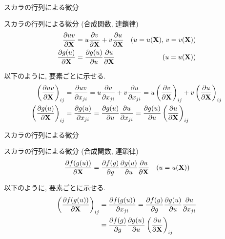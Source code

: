 \documentclass[dvipdfmx,notheorems,t]{beamer}
\begin{document}
\begin{frame}{スカラの行列による微分}
\begin{block}{スカラの行列による微分 (合成関数, 連鎖律)}
  \begin{align*}
    \pdv{uv}{\vb{X}} &= u \pdv{v}{\vb{X}} + v \pdv{u}{\vb{X}}
      & \text{($u = u(\vb{X})$, $v = v(\vb{X})$)} \\
    \pdv{g(u)}{\vb{X}} &= \pdv{g(u)}{u} \pdv{u}{\vb{X}}
      & \text{($u = u(\vb{X})$)}
  \end{align*}
\end{block}

以下のように, 要素ごとに示せる.
\begin{align*}
  \left( \pdv{uv}{\vb{X}} \right)_{ij} &= \pdv{uv}{x_{ji}}
    = u \pdv{v}{x_{ji}} + v \pdv{u}{x_{ji}}
    = u \left( \pdv{v}{\vb{X}} \right)_{ij} + v \left( \pdv{u}{\vb{X}} \right)_{ij} \\
  \left( \pdv{g(u)}{\vb{X}} \right)_{ij} &= \pdv{g(u)}{x_{ji}}
    = \pdv{g(u)}{u} \pdv{u}{x_{ji}}
    = \pdv{g(u)}{u} \left( \pdv{u}{\vb{X}} \right)_{ij}
\end{align*}
\end{frame}

\begin{frame}{スカラの行列による微分}
\begin{block}{スカラの行列による微分 (合成関数, 連鎖律)}
  \begin{align*}
    \pdv{f(g(u))}{\vb{X}} &= \pdv{f(g)}{g} \pdv{g(u)}{u} \pdv{u}{\vb{X}}
      & \text{($u = u(\vb{X})$)}
  \end{align*}
\end{block}

以下のように, 要素ごとに示せる.
\begin{align*}
  \left( \pdv{f(g(u))}{\vb{X}} \right)_{ij} &= \pdv{f(g(u))}{x_{ji}}
    = \pdv{f(g)}{g} \pdv{g(u)}{u} \pdv{u}{x_{ji}} \\
    &= \pdv{f(g)}{g} \pdv{g(u)}{u} \left( \pdv{u}{\vb{X}} \right)_{ij}
\end{align*}
\end{frame}
\end{document}
